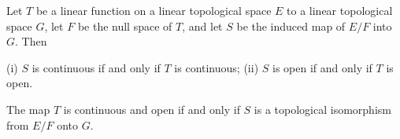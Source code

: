 Let $T$ be a linear function on a linear topological space $E$ to a linear topological space $G$, let $F$ be the null space of $T$, and let $S$ be the induced map of $E/F$ into $G$. Then

(i) $S$ is continuous if and only if $T$ is continuous;
(ii) $S$ is open if and only if $T$ is open.

The map $T$ is continuous and open if and only if $S$ is a topological isomorphism from $E/F$ onto $G$.
